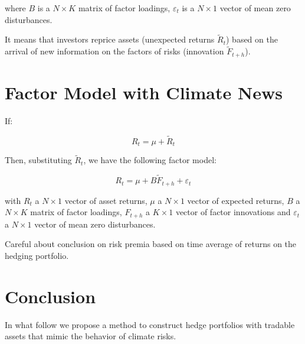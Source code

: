 where $B$ is a $N \times K$ matrix of factor loadings, $\varepsilon_t$ is a $N \times 1$ vector of mean zero disturbances.

It means that investors reprice assets (unexpected returns $\tilde{R}_t$) based on the arrival of new information on the factors of risks (innovation $\tilde{F}_{t+h}$).


\section{Factor Model with Climate News}

If:

\begin{equation}
    R_t = \mu + \tilde{R}_t
\end{equation}

Then, substituting $\tilde{R}_t$, we have the following factor model:

\begin{equation}
    R_t = \mu + B \tilde{F}_{t+h} + \varepsilon_t
\end{equation}

with $R_t$ a $N \times 1$ vector of 
asset returns, $\mu$ a $N \times 1$ vector
of expected returns, $B$ a $N \times K$ matrix
of factor loadings, $F_{t+h}$ a $K \times 1$ vector
of factor innovations and $\varepsilon_t$ a $N \times 1$
vector of mean zero disturbances.


Careful about conclusion on risk premia based 
on time average of returns on the hedging portfolio.

\section{Conclusion}

In what follow we propose a method to construct
hedge portfolios with tradable assets that
mimic the behavior of climate risks. 
